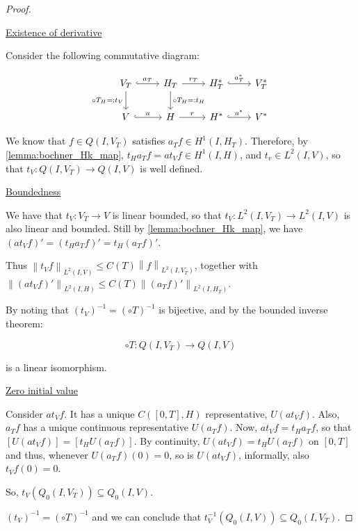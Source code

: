 \documentclass[english,a4paper,10pt,oneside]{scrbook}	%
\theoremstyle{break}
\newenvironment{mproof}[1][\proofname]{%
  \begin{proof}[#1]$ $\par\nobreak\ignorespaces
}{%
  \end{proof}
}
\renewcommand*{\proofname}{Proof}
\theoremstyle{remark}
\newcommand{\norm}[1]{\left\lVert#1\right\rVert}
\begin{document}
\begin{mproof}

\underline{Existence of derivative}

Consider the following commutative diagram:

\[\begin{tikzcd}
	{V_T} & {H_T} & {H_T^*} & {V^*_T} \\
	V & H & {H^*} & {V^*}
	\arrow["{a_T}", hook, from=1-1, to=1-2]
	\arrow["{r_T}", from=1-2, to=1-3]
	\arrow["{a_T^*}", hook, from=1-3, to=1-4]
	\arrow["r", from=2-2, to=2-3]
	\arrow["a^*", hook, from=2-3, to=2-4]
	\arrow["a", hook, from=2-1, to=2-2]
	\arrow["{\circ T_H=:t_V}"', from=1-1, to=2-1]
	\arrow["{\circ T_H=:t_H}", from=1-2, to=2-2]
\end{tikzcd}\]

We know that $f\in Q(I,V_T)$ satisfies $a_Tf \in H^1(I,H_T)$. Therefore, by \cref{lemma:bochner_Hk_map}, $t_H a_T f =a t_V f \in H^1(I,H)$, and $t_v  \in L^2(I,V)$, so that $t_V : Q(I,V_T)\rightarrow Q(I,V)$ is well defined.

\underline{Boundedness}

We have that $t_V: V_T \rightarrow V$ is linear bounded, so that $t_V: L^2(I,V_T)\rightarrow L^2(I,V)$ is also linear and bounded. Still by \cref{lemma:bochner_Hk_map}, we have $(a t_V f )' = (t_H a_T f)' = t_H(a_T f)'$.

Thus $\norm{t_V f}_{L^2(I, V)}\leq C(T) \norm{f}_{L^2(I, V_T)}$, together with $\norm{(a t_V f )'}_{L^2(I, H)}\leq C(T) \norm{(a_T f)'}_{L^2(I, H_T)}$.

By noting that $(t_V)^{-1} = (\circ T)^{-1} $ is bijective, and by the bounded inverse theorem:

$$\circ T : Q(I,V_T)\rightarrow Q(I,V)$$

is a linear isomorphism.

\underline{Zero initial value}

Consider $at_V f$. It has a unique $C([0,T],H)$ representative, $U(at_V f)$. Also, $a_T f$ has a unique continuous representative $U(a_T f)$. Now, $at_V f = t_H a_T f$, so that $[U(at_V f)] = [t_H U(a_T f)]$. By continuity, $U(at_V f) = t_H U(a_T f)$ on $[0,T]$ and thus, whenever $U(a_T f)(0)=0$, so is $U(at_V f)$, informally, also $t_Vf (0) =0$. 

So, $t_V(Q_0(I,V_T))\subseteq Q_0(I,V)$.

$(t_V)^{-1} = (\circ T)^{-1}$ and we can conclude that  $t_V^{-1}(Q_0(I,V))\subseteq Q_0(I,V_T)$.

\end{mproof}
\end{document}
